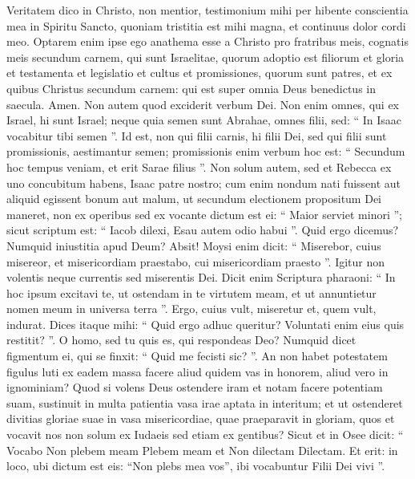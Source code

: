 \begin{biblechapter}
\begin{biblechapter}
\begin{biblechapter}
\begin{biblechapter}
\begin{biblechapter}
\begin{biblechapter}
\begin{biblechapter}
\begin{biblechapter}
\begin{biblechapter}
\verse Veritatem dico in Christo, non mentior, testimonium mihi per hibente conscientia mea in Spiritu Sancto, 
\verse quoniam tristitia est mihi magna, et continuus dolor cordi meo. 
\verse Optarem enim ipse ego anathema esse a Christo pro fratribus meis, cognatis meis secundum carnem, 
\verse qui sunt Israelitae, quorum adoptio est filiorum et gloria et testamenta et legislatio et cultus et promissiones, 
\verse quorum sunt patres, et ex quibus Christus secundum carnem: qui est super omnia Deus benedictus in saecula. Amen.
 \verse Non autem quod exciderit verbum Dei. Non enim omnes, qui ex Israel, hi sunt Israel; 
\verse neque quia semen sunt Abrahae, omnes filii, sed: “ In Isaac vocabitur tibi semen ”. 
\verse Id est, non qui filii carnis, hi filii Dei, sed qui filii sunt promissionis, aestimantur semen; 
\verse promissionis enim verbum hoc est: “ Secundum hoc tempus veniam, et erit Sarae filius ”. 
\verse Non solum autem, sed et Rebecca ex uno concubitum habens, Isaac patre nostro; 
\verse cum enim nondum nati fuissent aut aliquid egissent bonum aut malum, ut secundum electionem propositum Dei maneret, 
\verse non ex operibus sed ex vocante dictum est ei: “ Maior serviet minori ”; 
\verse sicut scriptum est: “ Iacob dilexi, Esau autem odio habui ”.
 \verse Quid ergo dicemus? Numquid iniustitia apud Deum? Absit! 
\verse Moysi enim dicit: “ Miserebor, cuius misereor, et misericordiam praestabo, cui misericordiam praesto ”.
 \verse Igitur non volentis neque currentis sed miserentis Dei. 
\verse Dicit enim Scriptura pharaoni: “ In hoc ipsum excitavi te, ut ostendam in te virtutem meam, et ut annuntietur nomen meum in universa terra ”. 
\verse Ergo, cuius vult, miseretur et, quem vult, indurat.
 \verse Dices itaque mihi: “ Quid ergo adhuc queritur? Voluntati enim eius quis restitit? ”. 
\verse O homo, sed tu quis es, qui respondeas Deo? Numquid dicet figmentum ei, qui se finxit: “ Quid me fecisti sic? ”. 
\verse An non habet potestatem figulus luti ex eadem massa facere aliud quidem vas in honorem, aliud vero in ignominiam? 
\verse Quod si volens Deus ostendere iram et notam facere potentiam suam, sustinuit in multa patientia vasa irae aptata in interitum; 
 \verse et ut ostenderet divitias gloriae suae in vasa misericordiae, quae praeparavit in gloriam, 
\verse quos et vocavit nos non solum ex Iudaeis sed etiam ex gentibus? 
\verse Sicut et in Osee dicit:
 “ Vocabo Non plebem meam Plebem meam
 et Non dilectam Dilectam. 
\verse Et erit: in loco, ubi dictum est eis:
 “Non plebs mea vos”,
 ibi vocabuntur Filii Dei vivi ”.

\end{biblechapter}
\end{biblechapter}
\end{biblechapter}
\end{biblechapter}
\end{biblechapter}
\end{biblechapter}
\end{biblechapter}
\end{biblechapter}
\end{biblechapter}
